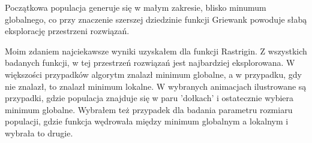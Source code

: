 \documentclass{article}
\begin{document}
Początkowa populacja generuje się w małym zakresie, blisko minumum globalnego, co przy znaczenie szerszej dziedzinie funkcji Griewank powoduje słabą eksplorację przestrzeni rozwiązań.

Moim zdaniem najciekawsze wyniki uzyskałem dla funkcji Rastrigin. Z wszystkich badanych funkcji, w tej przestrzeń rozwiązań jest najbardziej eksplorowana. W większości przypadków algorytm znalazł minimum globalne, a w przypadku, gdy nie znalazł, to znalazł minimum lokalne. W wybranych animacjach ilustrowane są przypadki, gdzie populacja znajduje się w paru 'dołkach' i ostatecznie wybiera minimum globalne. Wybrałem też przypadek dla badania parametru rozmiaru populacji, gdzie funkcja wędrowała między minimum globalnym a lokalnym i wybrała to drugie.
\end{document}
